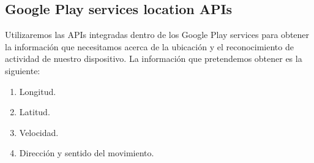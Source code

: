 \subsection{Google Play services location APIs}

Utilizaremos las APIs integradas dentro de los Google Play 
services para obtener la información que necesitamos acerca 
de la ubicación y el reconocimiento de actividad de nuestro dispositivo.
 La información que pretendemos obtener es la siguiente:

\begin{enumerate}
\item Longitud.
\item Latitud.
\item Velocidad.
\item Dirección y sentido del movimiento.
\end{enumerate}